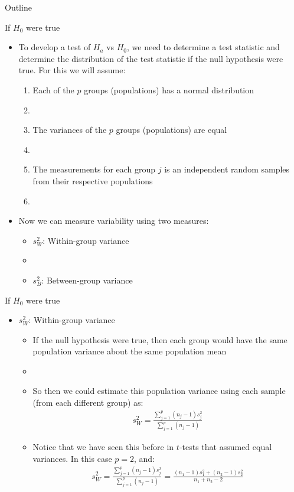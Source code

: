 \documentclass[xcolor=dvipsnames]{beamer}
\begin{document}
\begin{frame}{Outline}
	\tableofcontents[currentsection,subsectionstyle=show/shaded/hide]
\end{frame}

\begin{frame}{If $H_0$ were true}
	\begin{itemize}
		\item To develop a test of $H_a$ vs $H_0$, we need to determine a test statistic and determine the distribution of the test statistic if the null hypothesis were true. For this we will assume:
		\begin{enumerate}
			\item Each of the $p$ groups (populations) has a normal distribution
			\item[]
			\item The variances of the $p$ groups (populations) are equal
			\item[]
			\item The measurements for each group $j$ is an independent random samples from their respective populations
			\item[]
		\end{enumerate}
	\item Now we can measure variability using two measures:
	\begin{itemize}
		\item $s_W^2$: Within-group variance 
		\item[]
		\item $s_B^2$: Between-group variance 
	\end{itemize}
	\end{itemize}
\end{frame}

\begin{frame}{If $H_0$ were true}
	\begin{itemize}
		\item $s_W^2$: Within-group variance 
		\begin{itemize}
			\item If the null hypothesis were true, then each group would have the same population variance about the same population mean
			\item[]
			\item So then we could estimate this population variance using each sample (from each different group) as:
			\begin{gather*}
				s_W^2 = \frac{\sum_{j=1}^p (n_j -1) s_j^2}{\sum_{j=1}^p (n_j - 1)}
			\end{gather*}
			\item Notice that we have seen this before in $t$-tests that assumed equal variances. In this case $p=2$, and:
			\begin{gather*}
			s_W^2 = \frac{\sum_{j=1}^p (n_j -1) s_j^2}{\sum_{j=1}^p (n_j - 1)} = \frac{(n_1-1) s_1^2 + (n_2 -1) s_2^2}{n_1 + n_2 -2}
			\end{gather*}
		\end{itemize}
	\end{itemize}
\end{frame}
\end{document}
